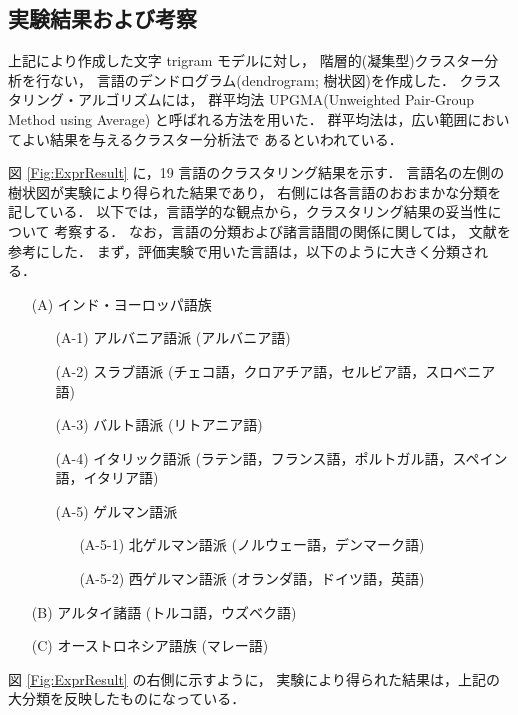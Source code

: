 \subsection{実験結果および考察}

上記により作成した文字 trigram モデルに対し，
階層的(凝集型)クラスター分析を行ない，
言語のデンドログラム(dendrogram; 樹状図)を作成した．
クラスタリング・アルゴリズムには，
群平均法 UPGMA(Unweighted Pair-Group Method using Average)\cite{Washio89Book}
と呼ばれる方法を用いた．
群平均法は，広い範囲においてよい結果を与えるクラスター分析法で
あるといわれている．

図 \ref{Fig:ExprResult} に，19 言語のクラスタリング結果を示す．
言語名の左側の樹状図が実験により得られた結果であり，
右側には各言語のおおまかな分類を記している．
以下では，言語学的な観点から，クラスタリング結果の妥当性について
考察する．
なお，言語の分類および諸言語間の関係に関しては，
文献\cite{GengoBook}を参考にした．
まず，評価実験で用いた言語は，以下のように大きく分類される．
\begin{itemize}
\item[(A)]      インド・ヨーロッパ語族
        \begin{itemize}
        \item[(A-1)] アルバニア語派 (アルバニア語)
        \item[(A-2)] スラブ語派 (チェコ語，クロアチア語，セルビア語，スロベニア語)
        \item[(A-3)] バルト語派 (リトアニア語)
        \item[(A-4)] イタリック語派 (ラテン語，フランス語，ポルトガル語，スペイン語，イタリア語)
        \item[(A-5)] ゲルマン語派
                \begin{itemize}
                \item[(A-5-1)] 北ゲルマン語派 (ノルウェー語，デンマーク語)
                \item[(A-5-2)] 西ゲルマン語派 (オランダ語，ドイツ語，英語)
                \end{itemize}
        \end{itemize}
\item[(B)]      アルタイ諸語 (トルコ語，ウズベク語)
\item[(C)]      オーストロネシア語族 (マレー語)
\end{itemize}
図 \ref{Fig:ExprResult} の右側に示すように，
実験により得られた結果は，上記の大分類を反映したものになっている．

